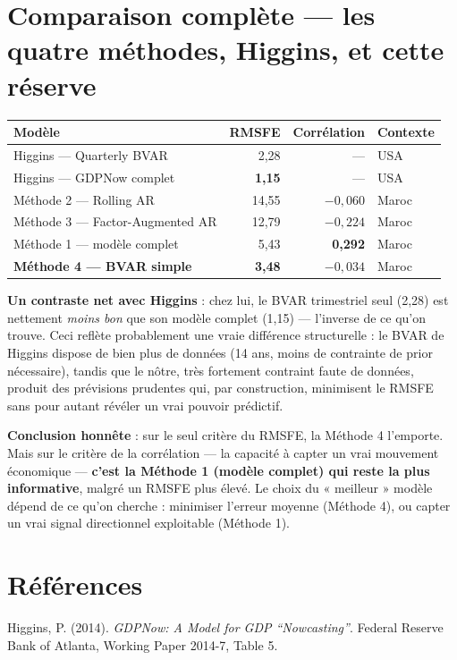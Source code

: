 \documentclass[11pt,a4paper]{article}
\begin{document}
\section{Comparaison complète --- les quatre méthodes, Higgins, et cette réserve}

\begin{center}
\small
\begin{tabular}{lrrl}
\toprule
\textbf{Modèle} & \textbf{RMSFE} & \textbf{Corrélation} & \textbf{Contexte} \\
\midrule
Higgins --- Quarterly BVAR & 2,28 & --- & USA \\
Higgins --- GDPNow complet & \textbf{1,15} & --- & USA \\
\midrule
Méthode 2 --- Rolling AR & 14,55 & $-0{,}060$ & Maroc \\
Méthode 3 --- Factor-Augmented AR & 12,79 & $-0{,}224$ & Maroc \\
Méthode 1 --- modèle complet & 5,43 & \textbf{0,292} & Maroc \\
\textbf{Méthode 4 --- BVAR simple} & \textbf{3,48} & $-0{,}034$ & Maroc \\
\bottomrule
\end{tabular}
\end{center}

\begin{alertebox}
\textbf{Un contraste net avec Higgins} : chez lui, le BVAR trimestriel seul (2,28) est nettement \emph{moins bon} que son modèle complet (1,15) --- l'inverse de ce qu'on trouve. Ceci reflète probablement une vraie différence structurelle : le BVAR de Higgins dispose de bien plus de données (14 ans, moins de contrainte de prior nécessaire), tandis que le nôtre, très fortement contraint faute de données, produit des prévisions prudentes qui, par construction, minimisent le RMSFE sans pour autant révéler un vrai pouvoir prédictif.
\end{alertebox}

\begin{resultatbox}
\textbf{Conclusion honnête} : sur le seul critère du RMSFE, la Méthode 4 l'emporte. Mais sur le critère de la corrélation --- la capacité à capter un vrai mouvement économique --- \textbf{c'est la Méthode 1 (modèle complet) qui reste la plus informative}, malgré un RMSFE plus élevé. Le choix du « meilleur » modèle dépend de ce qu'on cherche : minimiser l'erreur moyenne (Méthode 4), ou capter un vrai signal directionnel exploitable (Méthode 1).
\end{resultatbox}

\section*{Références}
\begin{enumerate}[leftmargin=1.6em, label=\textbf{[\arabic*]}]
\item \hypertarget{ref1}{} Higgins, P. (2014). \textit{GDPNow: A Model for GDP ``Nowcasting''}. Federal Reserve Bank of Atlanta, Working Paper 2014-7, Table 5.
\end{enumerate}
\end{document}
